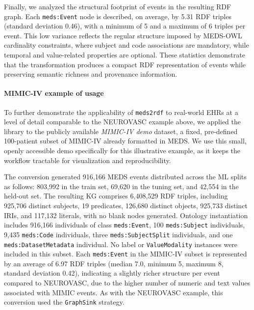 Finally, we analyzed the structural footprint of events in the resulting RDF graph. Each \texttt{meds:Event} node is described, on average, by 5.31 RDF triples (standard deviation 0.46), with a minimum of 5 and a maximum of 6 triples per event. This low variance reflects the regular structure imposed by MEDS-OWL cardinality constraints, where subject and code associations are mandatory, while temporal and value-related properties are optional. These statistics demonstrate that the transformation produces a compact RDF representation of events while preserving semantic richness and provenance information.

\paragraph{MIMIC-IV example of usage} To further demonstrate the applicability of \texttt{meds2rdf} to real-world EHRs at a level of detail comparable to the NEUROVASC example above, we applied the library to the publicly available \textit{MIMIC-IV demo} dataset, a fixed, pre-defined 100-patient subset of MIMIC-IV already formatted in MEDS. We use this small, openly accessible demo specifically for this illustrative example, as it keeps the workflow tractable for visualization and reproducibility. %

The conversion generated 916,166 MEDS events distributed across the ML splits as follows: 803,992 in the train set, 69,620 in the tuning set, and 42,554 in the held-out set. The resulting KG comprises 6,408,529 RDF triples, including 925,706 distinct subjects, 19 predicates, 126,680 distinct objects, 925,733 distinct IRIs, and 117,132 literals, with no blank nodes generated. Ontology instantiation includes 916,166 individuals of class \texttt{meds:Event}, 100 \texttt{meds:Subject} individuals, 9,435 \texttt{meds:Code} individuals, three \texttt{meds:SubjectSplit} individuals, and one \texttt{meds:DatasetMetadata} individual. No label or \texttt{ValueModality} instances were included in this subset. Each \texttt{meds:Event} in the MIMIC-IV subset is represented by an average of 6.97 RDF triples (median 7.0, minimum 5, maximum 8, standard deviation 0.42), indicating a slightly richer structure per event compared to NEUROVASC, due to the higher number of numeric and text values associated with MIMIC events. As with the NEUROVASC example, this conversion used the \texttt{GraphSink} strategy. %

